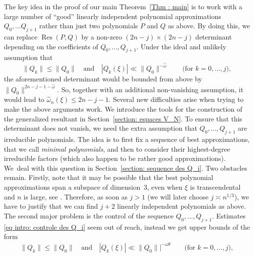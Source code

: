 \documentclass[JEP,XML,SOM,Unicode,NoFloatCountersInSection,published]{cedram}
\DeclareMathOperator\Res{Res}
\newcommand\homega{\widehat{\omega}}\newcommand\HH{\mathcal{H}}
\newcommand{\normH}[1]{\|#1\|}
\newcommand\AND{\quad\text{and}\quad}
\theoremstyle{definition}
\theoremstyle{plain}
\begin{document}
The key idea in the proof of our main Theorem~\ref{Thm : main} is to work with a large number of ``good'' linearly independent polynomial approximations $Q_0, \dots Q_{j+1}$ rather than just two polynomials $P$ and $Q$ as above. By doing this, we can replace $\Res(P,Q)$ by a non-zero $(2n-j)\times (2n-j)$ determinant depending on the coefficients of $Q_0,\dots,Q_{j+1}$. Under the ideal and unlikely assumption that
\begin{equation}
\label{eq intro: controle des Q_i}
\normH{Q_k} \leq \normH{Q_0} \AND |Q_k(\xi)| \ll \normH{Q_0}^{-\homega} \qquad \textrm{(for $k=0,\dots,j$)},
\end{equation}
the aforementioned determinant would be bounded from above by $\normH{Q_0}^{2n-j-1 - \homega}$. So, together with an additional non-vanishing assumption, it would lead to $\homega_n(\xi) \leq 2n-j-1$. Several new difficulties arise when trying to make the above arguments work. We introduce the tools for the construction of the generalized resultant in Section~\ref{section: espaces V_N}. To ensure that this determinant does not vanish, we need the extra assumption that $Q_0,\dots,Q_{j+1}$ are irreducible polynomials. The idea is to first fix a sequence of best approximations, that we call \emph{minimal polynomials}, and then to consider their highest-degree irreducible factors (which also happen to be rather good approximations). We~deal with this question in Section~\ref{section: sequence des Q_i}. Two obstacles remain. Firstly, note that it may be possible that the best polynomial approximations span a subspace of dimension~$3$, even when $\xi$ is transcendental and $n$ is large, see \cite[Th.\,1.3]{moshchevitin2007best}. Therefore, as soon as $j > 1$ (we will later choose $j\asymp n^{1/3}$), we have to justify that we can find $j+2$ linearly independent polynomials as above. The second major problem is the control of the sequence $Q_0,\dots,Q_{j+1}$. Estimates \eqref{eq intro: controle des Q_i} seem out of reach, instead we get upper bounds of the form
\begin{equation}
\label{eq intro: controle des Q_i V2}
\normH{Q_k} \leq \normH{Q_0} \AND |Q_k(\xi)| \ll \normH{Q_0}|^{-\homega\theta} \qquad \textrm{(for $k=0,\dots,j$)},
\end{equation}
\end{document}
